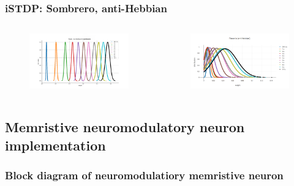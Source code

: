 \documentclass[12pt, aspectratio=169]{beamer}
\begin{document}
\begin{frame}
\frametitle{iSTDP: Sombrero, anti-Hebbian}
\begin{columns}[c] %
\begin{figure}
\includegraphics[width=1\linewidth]{Gauss_Fl_Ia_sombrero}
\end{figure}
\begin{figure}
\includegraphics[width=1\linewidth]{Gauss_Ia_antiHebb}
\end{figure}
\end{columns}
\end{frame}

\subsection{Memristive neuromodulatory neuron implementation}
\subsubsection{Block diagram of neuromodulatiory memristive neuron}
\end{document}
